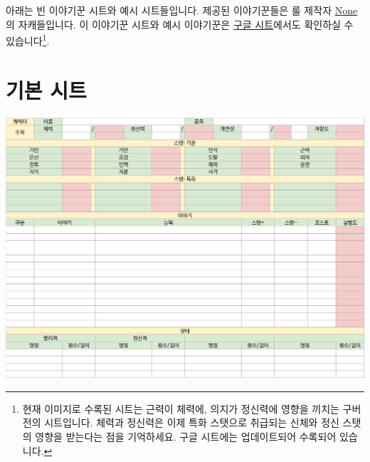 \documentclass{report}
\begin{document}
	아래는 빈 이야기꾼 시트와 예시 시트들입니다. 제공된 이야기꾼들은 룰 제작자 \href{https://www.twitter.com/n0n3x1573n7_WS}{None}의 자캐들입니다. 이 이야기꾼 시트와 예시 이야기꾼은 \href{https://docs.google.com/spreadsheets/d/1g3ZO-oALMVbytbE2tvSBdT6czxB32XHZ1crWIGavEhQ/edit?usp=sharing}{구글 시트}에서도 확인하실 수 있습니다\footnote{현재 이미지로 수록된 시트는 근력이 체력에, 의지가 정신력에 영향을 끼치는 구버전의 시트입니다. 체력과 정신력은 이제 특화 스탯으로 취급되는 신체와 정신 스탯의 영향을 받는다는 점을 기억하세요. 구글 시트에는 업데이트되어 수록되어 있습니다.}.
	
	\section*{기본 시트}
		\includegraphics[width=\textwidth]{./Chapters/WoS/sheets/base.png}
	
\end{document}
